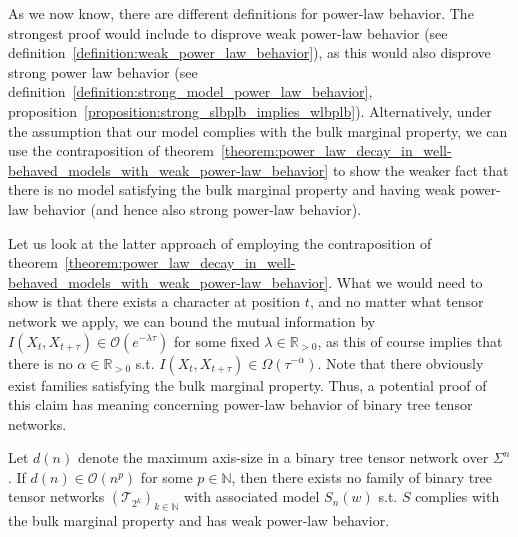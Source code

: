 \documentclass[../../main.tex]{subfiles}
\begin{document}
    \bigskip
    As we now know, there are different definitions for power-law behavior. The strongest proof would include to disprove weak power-law behavior (see definition~\ref{definition:weak_power_law_behavior}), as this would also disprove strong power law behavior (see definition~\ref{definition:strong_model_power_law_behavior}, proposition~\ref{proposition:strong_slbplb_implies_wlbplb}). Alternatively, under the assumption that our model complies with the bulk marginal property, we can use the contraposition of theorem~\ref{theorem:power_law_decay_in_well-behaved_models_with_weak_power-law_behavior} to show the weaker fact that there is no model satisfying the bulk marginal property and having weak power-law behavior (and hence also strong power-law behavior).

    Let us look at the latter approach of employing the contraposition of theorem~\ref{theorem:power_law_decay_in_well-behaved_models_with_weak_power-law_behavior}. What we would need to show is that there exists a character at position $t$, and no matter what tensor network we apply, we can bound the mutual information by $I(X_t, X_{t + \tau}) \in \mathcal{O}(e^{-\lambda \tau})$ for some fixed $\lambda \in \mathbb{R}_{>0}$, as this of course implies that there is no $\alpha \in \mathbb{R}_{>0}$ s.t. $I(X_t, X_{t + \tau}) \in \Omega(\tau^{-\alpha})$. Note that there obviously exist families satisfying the bulk marginal property. Thus, a potential proof of this claim has meaning concerning power-law behavior of binary tree tensor networks.

    \begin{theorem}
        Let $d(n)$ denote the maximum axis-size in a binary tree tensor network over $\Sigma^n$. If $d(n) \in \mathcal{O}(n^p)$ for some $p \in \mathbb{N}$, then there exists no family of binary tree tensor networks $\left(\mathcal{T}_{2^k}\right)_{k \in \mathbb{N}}$ with associated model $S_n(w)$ s.t. $S$ complies with the bulk marginal property and has weak power-law behavior.
    \end{theorem}
\end{document}
